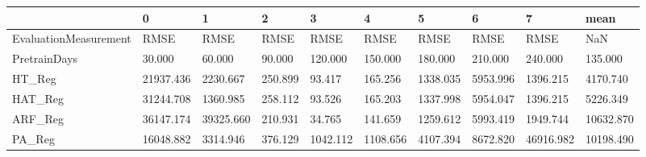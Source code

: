 \begin{tabular}{llllllllll}
\toprule
{} &         0 &         1 &       2 &        3 &        4 &        5 &        6 &         7 &      mean \\
\midrule
EvaluationMeasurement &      RMSE &      RMSE &    RMSE &     RMSE &     RMSE &     RMSE &     RMSE &      RMSE &       NaN \\
PretrainDays          &    30.000 &    60.000 &  90.000 &  120.000 &  150.000 &  180.000 &  210.000 &   240.000 &   135.000 \\
HT\_Reg                & 21937.436 &  2230.667 & 250.899 &   93.417 &  165.256 & 1338.035 & 5953.996 &  1396.215 &  4170.740 \\
HAT\_Reg               & 31244.708 &  1360.985 & 258.112 &   93.526 &  165.203 & 1337.998 & 5954.047 &  1396.215 &  5226.349 \\
ARF\_Reg               & 36147.174 & 39325.660 & 210.931 &   34.765 &  141.659 & 1259.612 & 5993.419 &  1949.744 & 10632.870 \\
PA\_Reg                & 16048.882 &  3314.946 & 376.129 & 1042.112 & 1108.656 & 4107.394 & 8672.820 & 46916.982 & 10198.490 \\
\bottomrule
\end{tabular}
